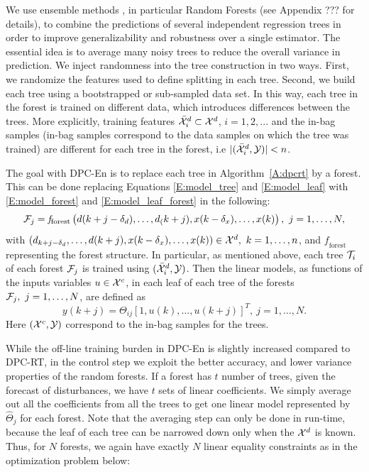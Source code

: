 We use ensemble methods \cite{Friedman2001}, in particular Random Forests (see Appendix ??? for details), to combine the predictions of several independent regression trees in order to improve generalizability and robustness over a single estimator. 
The essential idea is to average many noisy trees to reduce the overall variance in prediction.
We inject randomness into the tree construction in two ways. First, we randomize the features used to define splitting in each tree.
Second, we build each tree using a bootstrapped or sub-sampled data set.
In this way, each tree in the forest is trained on different data, which introduces differences between the trees.
\textcolor[rgb]{0,0,1}{More explicitly, training features $\bar{\mathcal{X}}^d_i\subset\mathcal{X}^d$, $i=1,2,...$ and the in-bag samples (in-bag samples correspond to the data samples on which the tree was trained) are different for each tree in the forest, i.e $|(\bar {\mathcal{X}}^d_i,\mathcal{Y})|<n$.}

\textcolor[rgb]{0,0,1}{The goal with DPC-En is to replace each tree in Algorithm~\ref{A:dpcrt} by a forest.
This can be done replacing Equations \eqref{E:model_tree} and \eqref{E:model_leaf} with \eqref{E:model_forest} and \eqref{E:model_leaf_forest} in the following:
\begin{equation}\label{E:model_forest}
\F_j = \mathit{f}_{\mathrm{forest}} \left( d(k+j-\delta_d),\ldots,d_(k+j),x(k-\delta_x),\ldots,x(k)  \right),\ j=1,\ldots,N,
\end{equation}
with $\left( d_{k+j-\delta_d},\ldots,d(k+j),x(k-\delta_x),\ldots,x(k)  \right)\in\X^d,\ k=1,\ldots,n$, and $\mathit{f}_{\mathrm{forest}}$ representing the forest structure.
In particular, as mentioned above, each tree $\mathcal{T}_i$ of each forest $\mathcal{F}_j$ is trained using $(\bar {\mathcal{X}}^d_i,\mathcal{Y})$.
Then the linear models, as functions of the inputs variables $u\in\mathcal{X}^c$, in each leaf of each tree of the forests $\mathcal{F}_j,\ j=1,\ldots,N$, are defined as
\begin{equation}\label{E:model_leaf_forest}
y(k+j) =  \Theta_{ij} [1,u(k),\ldots,u(k+j) ]^T,\ j=1,\ldots,N.
\end{equation}
Here $(\mathcal{X}^c,\mathcal{Y})$ correspond to the in-bag samples for the trees.}

While the off-line training burden in DPC-En is slightly increased compared to DPC-RT, in the control step we exploit the better accuracy, and lower variance properties of the random forests. 
If a forest has $t$ number of trees, given the forecast of disturbances, we have $t$ sets of linear coefficients. We simply average out all the coefficients from all the trees to get one linear model represented by $\hat{\Theta}_j$ for each forest. Note that the averaging step can only be done in run-time, because the leaf of each tree can be narrowed down only when the $\mathcal{X}^d$ is known. Thus, for $N$ forests, we again have exactly $N$ linear equality constraints as in the optimization problem below:

